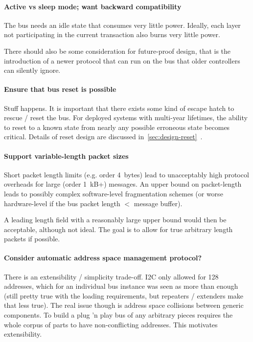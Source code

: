 \paragraph{Active vs sleep mode; want backward compatibility}
The bus needs an idle state that consumes very little power. Ideally, each
layer not participating in the current transaction also burns very little
power.

There should also be some consideration for future-proof design, that is the
introduction of a newer protocol that can run on the bus that older
controllers can silently ignore.

\paragraph{Ensure that bus reset is possible}
Stuff happens. It is important that there exists some kind of escape hatch to
rescue / reset the bus. For deployed systems with multi-year lifetimes, the
ability to reset to a known state from nearly any possible erroneous state
becomes critical. Details of reset design are discussed
in~\ref{sec:design-reset}~.

\paragraph{Support variable-length packet sizes}
Short packet length limits (e.g. order 4~bytes) lead to unacceptably high
protocol overheads for large (order 1~kB+) messages. An upper bound on
packet-length leads to possibly complex software-level fragmentation schemes
(or worse hardware-level if the bus packet length $<$ message buffer).

A leading length field with a reasonably large upper bound would then be
acceptable, although not ideal. The goal is to allow for true arbitrary length
packets if possible.

\paragraph{Consider automatic address space management protocol?}
There is an extensibility / simplicity trade-off. I2C only allowed for 128
addresses, which for an individual bus instance was seen as more than enough
(still pretty true with the loading requirements, but repeaters / extenders
make that less true). The real issue though is address space collisions
between generic components. To build a plug 'n play bus of any arbitrary
pieces requires the whole corpus of parts to have non-conflicting addresses.
This motivates extensibility.

